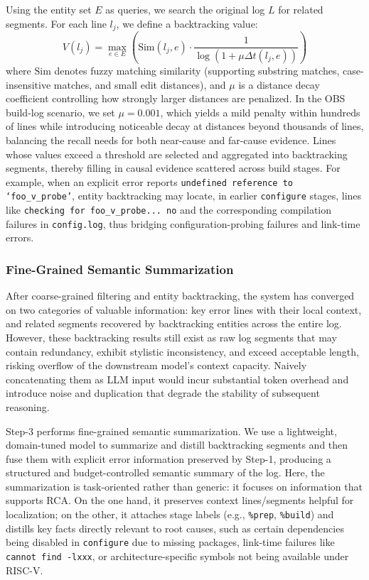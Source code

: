 \documentclass[sigconf]{acmart}
\begin{document}
Using the entity set $E$ as queries, we search the original log $L$ for related segments. For each line $l_j$, we define a backtracking value:
\begin{equation}
V(l_j) = \max_{e \in E}\left(\mathrm{Sim}(l_j, e) \cdot \frac{1}{\log(1 + \mu \Delta t(l_j, e))}\right)
\end{equation}
where $\mathrm{Sim}$ denotes fuzzy matching similarity (supporting substring matches, case-insensitive matches, and small edit distances), and $\mu$ is a distance decay coefficient controlling how strongly larger distances are penalized. In the OBS build-log scenario, we set $\mu=0.001$, which yields a mild penalty within hundreds of lines while introducing noticeable decay at distances beyond thousands of lines, balancing the recall needs for both near-cause and far-cause evidence. Lines whose values exceed a threshold are selected and aggregated into backtracking segments, thereby filling in causal evidence scattered across build stages. For example, when an explicit error reports \texttt{undefined reference to `foo\_v\_probe'}, entity backtracking may locate, in earlier \texttt{configure} stages, lines like \texttt{checking for foo\_v\_probe... no} and the corresponding compilation failures in \texttt{config.log}, thus bridging configuration-probing failures and link-time errors.

\subsubsection{Fine-Grained Semantic Summarization}

After coarse-grained filtering and entity backtracking, the system has converged on two categories of valuable information: key error lines with their local context, and related segments recovered by backtracking entities across the entire log. However, these backtracking results still exist as raw log segments that may contain redundancy, exhibit stylistic inconsistency, and exceed acceptable length, risking overflow of the downstream model's context capacity. Naively concatenating them as LLM input would incur substantial token overhead and introduce noise and duplication that degrade the stability of subsequent reasoning.

Step-3 performs fine-grained semantic summarization. We use a lightweight, domain-tuned model to summarize and distill backtracking segments and then fuse them with explicit error information preserved by Step-1, producing a structured and budget-controlled semantic summary of the log. Here, the summarization is task-oriented rather than generic: it focuses on information that supports RCA. On the one hand, it preserves context lines/segments helpful for localization; on the other, it attaches stage labels (e.g., \texttt{\%prep}, \texttt{\%build}) and distills key facts directly relevant to root causes, such as certain dependencies being disabled in \texttt{configure} due to missing packages, link-time failures like \texttt{cannot find -lxxx}, or architecture-specific symbols not being available under RISC-V.
\end{document}
